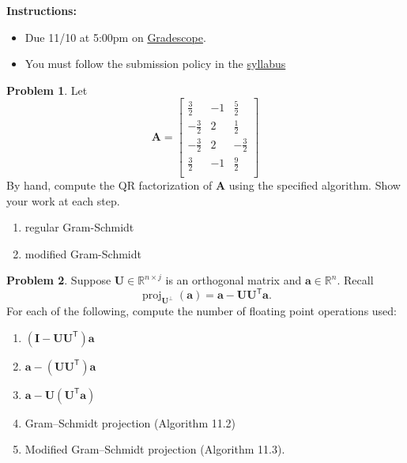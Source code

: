 \documentclass[12pt]{article}
\theoremstyle{definition}
\newtheorem{problem}{Problem}
\renewcommand{\vec}{\mathbf}
\newcommand{\T}{\mathsf{T}}
\begin{document}
\textbf{\Large{}}
    
    \vspace{-1.8em}
    \hrulefill
 
\textbf{Instructions:}
    \begin{itemize}
        \item Due 11/10 at 5:00pm on \href{https://www.gradescope.com/courses/570477/}{Gradescope}.
        \item You must follow the submission policy in the \href{https://courses.chen.pw/na_f2023/syllabus.html}{syllabus} 
\end{itemize}
   
\vspace{.5em}

\begin{problem}
    Let \[
        \vec{A} = 
        \begin{bmatrix}
 \frac{3}{2} & -1 & \frac{5}{2} \\
 -\frac{3}{2} & 2 & \frac{1}{2} \\
 -\frac{3}{2} & 2 & -\frac{3}{2} \\
 \frac{3}{2} & -1 & \frac{9}{2} \\
        \end{bmatrix}
    \]
    By hand, compute the QR factorization of $\vec{A}$ using the specified algorithm. Show your work at each step.
    \begin{enumerate}
        \item regular Gram-Schmidt 
        \item modified Gram-Schmidt 
    \end{enumerate}
\end{problem}


\begin{problem}
    Suppose $\vec{U}\in\mathbb{R}^{n\times j}$ is an orthogonal matrix and $\vec{a}\in\mathbb{R}^n$.
    Recall
    \[
        \operatorname{proj}_{\vec{U}^\perp}(\vec{a}) = \vec{a} - \vec{U}\vec{U}^\T \vec{a}.
    \]
    For each of the following, compute the number of floating point operations used:
    \begin{enumerate}
        \item $(\vec{I} - \vec{U}\vec{U}^\T) \vec{a}$
        \item $\vec{a} - (\vec{U}\vec{U}^\T)\vec{a}$ 
        \item $\vec{a} - \vec{U}(\vec{U}^\T\vec{a})$ 
        \item Gram--Schmidt projection (Algorithm 11.2) 
        \item Modified Gram--Schmidt projection (Algorithm 11.3).
    \end{enumerate}
\end{problem}
\end{document}
